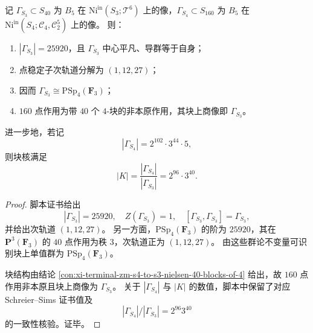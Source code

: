\begin{conclusion}\label{con:xi-terminal-zm-braid-monodromy-psp4f3-identification}
记 \(\Gamma_{S_3}\subset S_{40}\) 为 \(B_5\) 在
\(\mathrm{Ni}^{\mathrm{in}}(S_3;\mathcal T^6)\) 上的像，\(\Gamma_{S_4}\subset S_{160}\) 为 \(B_5\) 在
\(\mathrm{Ni}^{\mathrm{in}}(S_4;\mathcal C_4,\mathcal C_2^5)\) 上的像。
则：
\begin{enumerate}
  \item \(|\Gamma_{S_3}|=25920\)，且 \(\Gamma_{S_3}\) 中心平凡、导群等于自身；
  \item 点稳定子次轨道分解为 \((1,12,27)\)；
  \item 因而 \(\Gamma_{S_3}\cong \mathrm{PSp}_4(\mathbf F_3)\)；
  \item \(160\) 点作用为带 \(40\) 个 \(4\)-块的非本原作用，其块上商像即 \(\Gamma_{S_3}\)。
\end{enumerate}
进一步地，若记
\[
|\Gamma_{S_4}|=2^{102}\cdot 3^{44}\cdot 5,
\]
则块核满足
\[
|K|=\frac{|\Gamma_{S_4}|}{|\Gamma_{S_3}|}=2^{96}\cdot 3^{40}.
\]
\end{conclusion}
\begin{proof}
脚本证书给出
\[
|\Gamma_{S_3}|=25920,\quad Z(\Gamma_{S_3})=1,\quad [\Gamma_{S_3},\Gamma_{S_3}]=\Gamma_{S_3},
\]
并给出次轨道 \((1,12,27)\)。
另一方面，\(\mathrm{PSp}_4(\mathbf F_3)\) 的阶为 \(25920\)，其在 \(\mathbf P^3(\mathbf F_3)\) 的 \(40\) 点作用为秩 \(3\)，次轨道正为 \((1,12,27)\)。
由这些群论不变量可识别块上单值群为 \(\mathrm{PSp}_4(\mathbf F_3)\)。

块结构由结论 \ref{con:xi-terminal-zm-s4-to-s3-nielsen-40-blocks-of-4} 给出，故 \(160\) 点作用非本原且块上商像为 \(\Gamma_{S_3}\)。
关于 \(|\Gamma_{S_4}|\) 与 \(|K|\) 的数值，脚本中保留了对应 Schreier--Sims 证书值及
\[
|\Gamma_{S_4}|/|\Gamma_{S_3}|=2^{96}3^{40}
\]
的一致性核验。证毕。
\end{proof}


